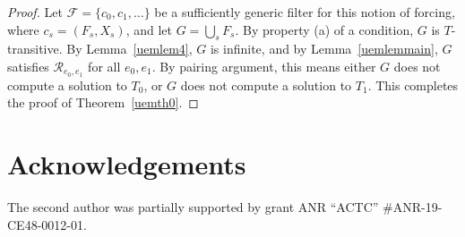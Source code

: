 \documentclass{amsart}
\theoremstyle{definition}
\theoremstyle{remark}
\numberwithin{equation}{section}
\theoremstyle{noparens}
\def\mcal{\mathcal}
\newcommand{\Fcal}{\mathcal{F}}
\begin{document}
\begin{proof}
 Let $\Fcal = \{c_0, c_1, \dots \}$ be a sufficiently generic filter for this notion of forcing,
where $c_s = (F_s, X_s)$, and let $G = \bigcup_s F_s$.
By property (a) of a condition, $G$ is $T$-transitive.
By Lemma~\ref{uemlem4}, $G$ is infinite,
and by Lemma~\ref{uemlemmain},
$G$ satisfies $\mcal{R}_{e_0,e_1}$ for all $e_0,e_1$.
 By pairing
argument, this means either $G$ does not compute
a solution to $T_0$, or $G $ does not compute a solution to $T_1$.
This completes the proof of Theorem~\ref{uemth0}.
\end{proof} %

\section*{Acknowledgements}

The second author was partially supported by grant ANR ``ACTC'' \#ANR-19-CE48-0012-01.





\appendix

%
\end{document}
